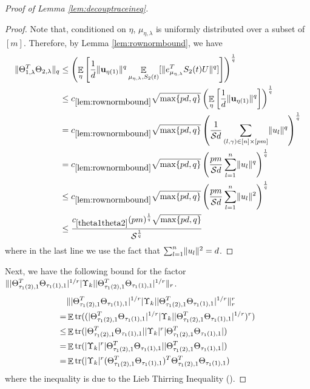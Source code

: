 \documentclass[11pt]{amsart}
\numberwithin{equation}{section}
\numberwithin{equation}{section}
\DeclareMathOperator{\E}{\mathbb{E}}
\DeclareMathOperator*{\tr}{tr}
\newcommand{\cS}{\mathcal{S}}
\DeclarePairedDelimiter{\norm}{\lVert}{\rVert}
\theoremstyle{remark}
\theoremstyle{definition}
\begin{document}
\begin{proof}[Proof of Lemma \ref{lem:decouptraceineq}]
\begin{proof}
Note that, conditioned on $\eta$, $\mu_{\eta, \lambda}$ is uniformly distributed over a subset of $[m]$. Therefore, by Lemma \ref{lem:rownormbound}, we have  
\begin{align*}
    \norm{\Theta_{1,\lambda}^T\Theta_{2,\lambda}}_{q} &\le \left( \E_{\eta} \left[ \frac{1}{d} \norm{ \mathbf{u}_{\eta(1)} }^{q} \E_{\mu_{\eta, \lambda}, S_2(t)}[ \norm{e_{\mu_{\eta,\lambda}}^TS_2(t)U}^{q}] \right] \right)^\frac{1}{q} \\
&\le c_{\ref*{lem:rownormbound}}\sqrt{\max \{ pd, q \}} \left( \E_{\eta} \left[ \frac{1}{d} \norm{ \mathbf{u}_{\eta(1)} }^{q} \right] \right)^\frac{1}{q} \\
    &= c_{\ref*{lem:rownormbound}}\sqrt{\max \{ pd, q \}} \left( \frac{1}{\cS  d} \sum_{(l,\gamma) \in [n]\times [pm]} \norm{u_l}^{q} \right)^\frac{1}{q} \\
    &= c_{\ref*{lem:rownormbound}}\sqrt{\max \{ pd, q \}} \left( \frac{pm}{\cS  d} \sum_{l=1}^{n} \norm{u_l}^{q} \right)^\frac{1}{q} \\
    &\le c_{\ref*{lem:rownormbound}}\sqrt{\max \{ pd, q \}} \left( \frac{pm}{\cS  d} \sum_{l=1}^{n} \norm{u_l}^{2} \right)^\frac{1}{q} \\
    &\le \frac{c_{\ref*{theta1theta2}}(pm)^{\frac{1}{q}}\sqrt{\max \{ pd, q \}}}{\cS^\frac{1}{q}}
\end{align*}
where in the last line we use the fact that $\sum_{l=1}^{n} \norm{u_l}^{2} = d$.

\end{proof}


Next, we have the following bound for the factor $\norm{|\Theta_{\tau_{1}(2),1}^T\Theta_{\tau_{1}(1),1}|^{1/r} |\Upsilon_k| |\Theta_{\tau_{1}(2),1}^T\Theta_{\tau_{1}(1),1}|^{1/r}}_{r}$.
\begin{align*}
    &\norm{|\Theta_{\tau_{1}(2),1}^T\Theta_{\tau_{1}(1),1}|^{1/r} |\Upsilon_k| |\Theta_{\tau_{1}(2),1}^T\Theta_{\tau_{1}(1),1}|^{1/r}}_{r}^{r} \\=&\E\tr((| \Theta_{\tau_{1}(2),1}^T\Theta_{\tau_{1}(1),1}|^{1/r} |\Upsilon_k| | \Theta_{\tau_{1}(2),1}^T\Theta_{\tau_{1}(1),1}|^{1/r})^{r})
    \\ \le & \E\tr(| \Theta_{\tau_{1}(2),1}^T\Theta_{\tau_{1}(1),1}| |\Upsilon_k|^{r} | \Theta_{\tau_{1}(2),1}^T\Theta_{\tau_{1}(1),1}|)
    \\=& \E\tr( |\Upsilon_k|^{r} | \Theta_{\tau_{1}(2),1}^T\Theta_{\tau_{1}(1),1}|| \Theta_{\tau_{1}(2),1}^T\Theta_{\tau_{1}(1),1}|)
    \\=& \E\tr( |\Upsilon_k|^{r}  (\Theta_{\tau_{1}(2),1}^T\Theta_{\tau_{1}(1),1})^T \Theta_{\tau_{1}(2),1}^T\Theta_{\tau_{1}(1),1})
    \end{align*}
where the inequality is due to the Lieb Thirring Inequality (\cite[Lemma 5.4]{brailovskaya2022universality}).


\end{proof}
\end{document}
